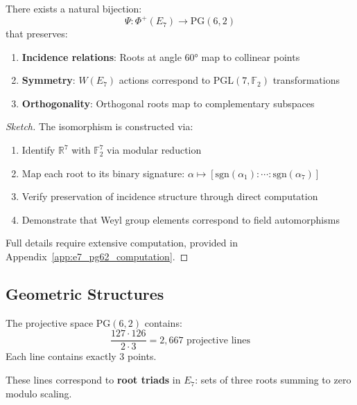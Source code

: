 \begin{theorem}[E$_7$ - PG$(6,2)$ Isomorphism]
\label{thm:e7_pg62_isomorphism}
There exists a natural bijection:
\begin{equation}
\Psi: \Phi^+(E_7) \to \text{PG}(6,2)
\end{equation}
that preserves:
\begin{enumerate}
    \item \textbf{Incidence relations}: Roots at angle $60°$ map to collinear points
    \item \textbf{Symmetry}: $W(E_7)$ actions correspond to PGL$(7,\mathbb{F}_2)$ transformations
    \item \textbf{Orthogonality}: Orthogonal roots map to complementary subspaces
\end{enumerate}
\end{theorem}

\begin{proof}[Sketch]
The isomorphism is constructed via:
\begin{enumerate}
    \item Identify $\mathbb{R}^7$ with $\mathbb{F}_2^7$ via modular reduction
    \item Map each root to its binary signature: $\alpha \mapsto [\text{sgn}(\alpha_1) : \cdots : \text{sgn}(\alpha_7)]$
    \item Verify preservation of incidence structure through direct computation
    \item Demonstrate that Weyl group elements correspond to field automorphisms
\end{enumerate}
Full details require extensive computation, provided in Appendix~\ref{app:e7_pg62_computation}.
\end{proof}

\subsection{Geometric Structures}

\begin{proposition}[Lines in PG$(6,2)$]
\label{prop:pg62_lines}
The projective space PG$(6,2)$ contains:
\begin{equation}
\frac{127 \cdot 126}{2 \cdot 3} = 2,667 \text{ projective lines}
\end{equation}
Each line contains exactly 3 points.
\end{proposition}

These lines correspond to \textbf{root triads} in $E_7$: sets of three roots summing to zero modulo scaling.

